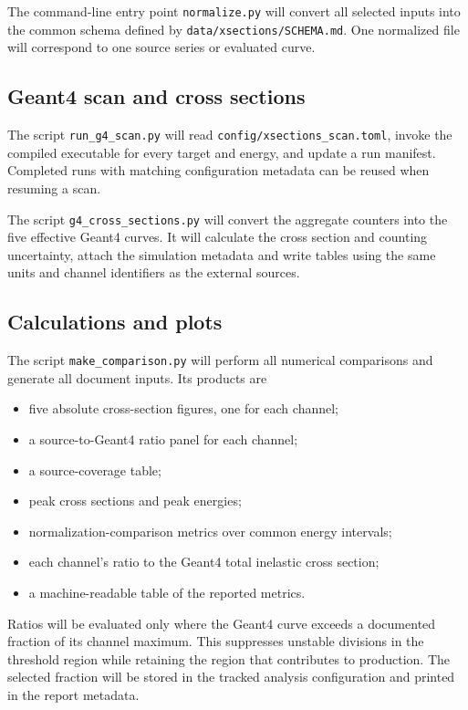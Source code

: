 \documentclass[11pt]{article}
\newcommand{\file}[1]{\texttt{#1}}
\begin{document}
The command-line entry point \file{normalize.py} will convert all selected
inputs into the common schema defined by \file{data/xsections/SCHEMA.md}.  One
normalized file will correspond to one source series or evaluated curve.

\subsection{Geant4 scan and cross sections}

The script \file{run\_g4\_scan.py} will read
\file{config/xsections\_scan.toml}, invoke the compiled executable for every
target and energy, and update a run manifest.  Completed runs with matching
configuration metadata can be reused when resuming a scan.

The script \file{g4\_cross\_sections.py} will convert the aggregate counters
into the five effective Geant4 curves.  It will calculate the cross section and
counting uncertainty, attach the simulation metadata and write tables using the
same units and channel identifiers as the external sources.

\subsection{Calculations and plots}

The script \file{make\_comparison.py} will perform all numerical comparisons
and generate all document inputs.  Its products are
\begin{itemize}[nosep]
  \item five absolute cross-section figures, one for each channel;
  \item a source-to-Geant4 ratio panel for each channel;
  \item a source-coverage table;
  \item peak cross sections and peak energies;
  \item normalization-comparison metrics over common energy intervals;
  \item each channel's ratio to the Geant4 total inelastic cross section;
  \item a machine-readable table of the reported metrics.
\end{itemize}
Ratios will be evaluated only where the Geant4 curve exceeds a documented
fraction of its channel maximum.  This suppresses unstable divisions in the
threshold region while retaining the region that contributes to production.
The selected fraction will be stored in the tracked analysis configuration and
printed in the report metadata.
\end{document}
